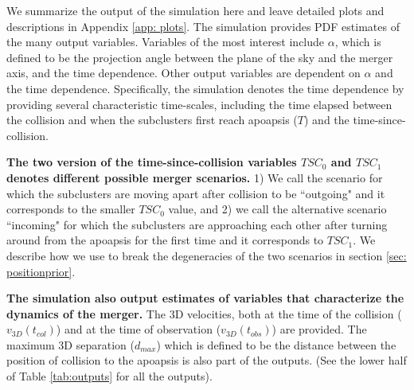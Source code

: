 We summarize the output of the simulation here and leave detailed
plots and descriptions in Appendix \ref{app: plots}. The simulation provides PDF estimates of the many output variables. Variables
of the most interest include $\alpha$, which is defined to be the projection
angle between the plane of the sky and the merger axis, and the time
dependence. Other output variables are dependent on $\alpha$ and the time
dependence. Specifically, the simulation denotes the time dependence by
providing several characteristic time-scales, including the time
elapsed between the collision and when the subclusters first reach apoapsis
($T$) and the time-since-collision.

\textbf{The two version of the time-since-collision variables $TSC_0$ and
$TSC_1$ denotes different possible merger scenarios.} 1) We call the scenario for which the subclusters are
moving apart after collision to be ``outgoing" and it corresponds to the
smaller $TSC_0$ value, and 2) we call the alternative scenario 
``incoming" for which the subclusters are approaching each other after turning
around from the apoapsis for the first time and it corresponds to $TSC_1$.
We describe how we use to break the degeneracies of the two scenarios in
section \ref{sec: positionprior}. 
 
\textbf{The simulation also output estimates of variables that characterize
the dynamics of the merger.} The 3D velocities, both at the time of the
collision ($v_{3D}(t_{col})$) and at the time of observation
($v_{3D}(t_{obs})$) are provided. The maximum 3D separation ($d_{max}$)
which is defined to be the distance between the position of collision to the apoapsis is also part of
the outputs. (See the lower half of Table \ref{tab:outputs} for all the outputs).
%


